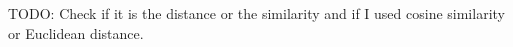 TODO: Check if it is the distance or the similarity and if I used cosine similarity or Euclidean distance.